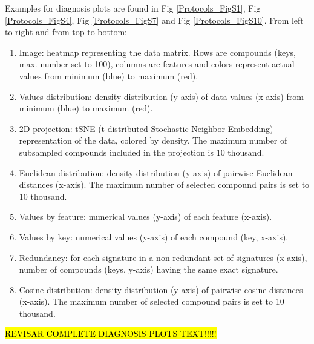 Examples for diagnosis plots are found in Fig \ref{Protocols_FigS1}, Fig \ref{Protocols_FigS4}, Fig \ref{Protocols_FigS7} and Fig \ref{Protocols_FigS10}. From left to right and from top to bottom:
\begin{enumerate}
    \item[\textbullet] Image: heatmap representing the data matrix. Rows are compounds (keys, max. number set to 100), columns are features and colors represent actual values from minimum (blue) to maximum (red).
    \item[\textbullet] Values distribution: density distribution (y-axis) of data values (x-axis) from minimum (blue) to maximum (red). 
    \item[\textbullet] 2D projection: tSNE (t-distributed Stochastic Neighbor Embedding) representation of the data, colored by density. The maximum number of subsampled compounds included in the projection is 10 thousand. 
    \item[\textbullet] Euclidean distribution: density distribution (y-axis) of pairwise Euclidean distances (x-axis). The maximum number of selected compound pairs is set to 10 thousand. 
    \item[\textbullet] Values by feature: numerical values (y-axis) of each feature (x-axis).
    \item[\textbullet] Values by key: numerical values (y-axis) of each compound (key, x-axis).
    \item[\textbullet] Redundancy: for each signature in a non-redundant set of signatures (x-axis), number of compounds (keys, y-axis) having the same exact signature.  
    \item[\textbullet] Cosine distribution: density distribution (y-axis) of pairwise cosine distances (x-axis). The maximum number of selected compound pairs is set to 10 thousand.
\end{enumerate}

\hl{REVISAR COMPLETE DIAGNOSIS PLOTS TEXT!!!!!}


